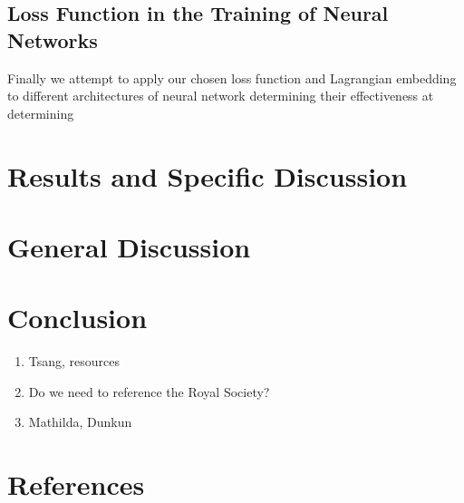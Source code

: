 \documentclass[10pt]{iopart}
\begin{document}

\subsection{Loss Function in the Training of Neural Networks}

Finally we attempt to apply our chosen loss function and Lagrangian embedding to different architectures of neural network determining their effectiveness at determining

\section{Results and Specific Discussion}


\section{General Discussion}



\section{Conclusion}

\ack

\begin{enumerate}
	\item Tsang, resources
	\item Do we need to reference the Royal Society?
	\item Mathilda, Dunkun
\end{enumerate}

\section*{References}


\end{document}
